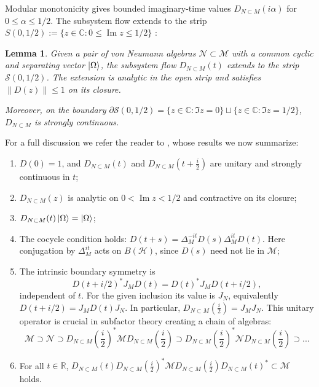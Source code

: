 \documentclass[a4paper,11pt]{article}
\newtheorem{lemma}[theorem]{Lemma}
\theoremstyle{definition}
\newcommand{\mH}{\mathcal{H}}
\begin{document}
Modular monotonicity gives bounded imaginary-time values $D_{N\subset M}(i\alpha)$ for $0\leq\alpha\leq1/2$. The subsystem flow extends to the strip $S(0,1/2):=\{z\in\mathbb C:0\leq\operatorname{Im}z\leq1/2\}$ \cite{revolutionizing}:
\begin{lemma}
    Given a pair of von Neumann algebras $\mathcal N\subset\mathcal M$ with a common cyclic and separating vector $\ket{\Omega}$, the subsystem flow $D_{N\subset M}(t)$ extends to the strip $\mathcal{S}(0,1/2)$. The extension is analytic in the open strip and satisfies $\|D(z)\|\leq1$ on its closure.

    Moreover, on the boundary $\partial\mathcal{S}(0,1/2) = \{z\in\mathbb{C}:\Im{z} = 0\}\sqcup\{z\in\mathbb{C}:\Im{z} = 1/2\}$, $D_{N\subset M}$ is strongly continuous.
\end{lemma}
For a full discussion we refer the reader to \cite{revolutionizing}, whose results we now summarize:
\begin{enumerate}
    \item $D(0)=1$, and $D_{N\subset M}(t)$ and $D_{N\subset M}(t +\frac{i}{2})$ are unitary and strongly continuous in $t$;
    \item $D_{N\subset M}(z)$ is analytic on $0<\operatorname{Im}z<1/2$ and contractive on its closure;
    \item $D_{N\subset M}(t)\ket{\Omega} = \ket{\Omega}$;
    \item The cocycle condition holds: $D(t+s)=\Delta_M^{-it}D(s)\Delta_M^{it}D(t)$. Here conjugation by $\Delta_M^{it}$ acts on $B(\mH)$, since $D(s)$ need not lie in $\mathcal M$;
    \item The intrinsic boundary symmetry is
    \[
     D(t+i/2)^*J_M D(t)=D(t)^*J_M D(t+i/2),
    \]
    independent of $t$. For the given inclusion its value is $J_N$, equivalently
    $D(t+i/2)=J_M D(t)J_N$. In particular, $D_{N\subset M}(\frac{i}{2}) = J_MJ_N$. This unitary operator is crucial in subfactor theory creating a chain of algebras:
    \begin{equation}
        \mathcal M\supset\mathcal N\supset D_{N\subset M}(\frac{i}{2})^*\mathcal MD_{N\subset M}(\frac{i}{2})\supset D_{N\subset M}(\frac{i}{2})^*\mathcal ND_{N\subset M}(\frac{i}{2})\supset...
    \end{equation}
    \item For all $t\in\mathbb{R}$, $D_{N\subset M}(t)D_{N\subset M}(\frac{i}{2})^*\mathcal MD_{N\subset M}(\frac{i}{2})D_{N\subset M}(t)^*\subset\mathcal M$ holds.
\end{enumerate}
\end{document}
